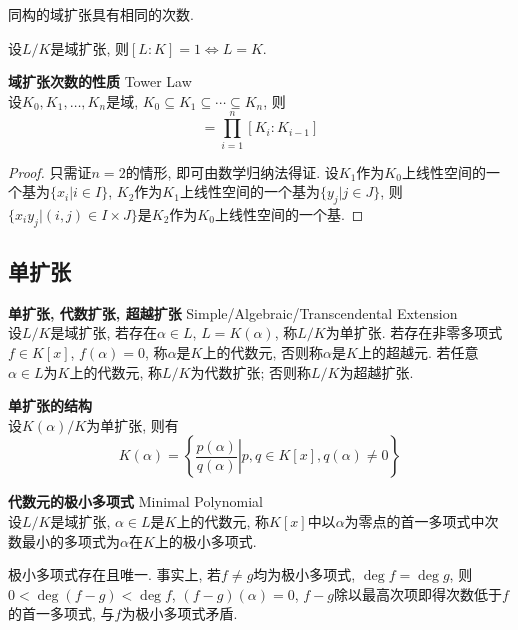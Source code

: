 同构的域扩张具有相同的次数. 

设$L/K$是域扩张, 则$[L:K]=1 \iff L=K$. 

\begin{dfn}\textbf{域扩张次数的性质} Tower Law\\
设$K_0,K_1,\dots,K_n$是域, $K_0 \subseteq K_1 \subseteq \cdots \subseteq K_n$, 则
\begin{equation}
    [K_n:K_0] = \prod_{i=1}^n [K_i:K_{i-1}]
\end{equation}
\end{dfn}
\begin{proof}
只需证$n=2$的情形, 即可由数学归纳法得证. 设$K_1$作为$K_0$上线性空间的一个基为$\{x_i \vert i\in I\}$, $K_2$作为$K_1$上线性空间的一个基为$\{y_j \vert j\in J\}$, 则$\{x_iy_j \vert (i,j)\in I\times J\}$是$K_2$作为$K_0$上线性空间的一个基. 
\end{proof}

\subsection{单扩张}

\begin{dfn} \textbf{单扩张, 代数扩张, 超越扩张} Simple/Algebraic/Transcendental Extension\\
设$L/K$是域扩张, 若存在$\alpha\in L$, $L=K(\alpha)$, 称$L/K$为单扩张. 若存在非零多项式$f\in K[x]$, $f(\alpha)=0$, 称$\alpha$是$K$上的代数元, 否则称$\alpha$是$K$上的超越元. 若任意$\alpha\in L$为$K$上的代数元, 称$L/K$为代数扩张;  否则称$L/K$为超越扩张. 
\end{dfn}


\begin{lem} \textbf{单扩张的结构}\\
设$K(\alpha)/K$为单扩张, 则有
\begin{equation}
    K(\alpha)=\left\{\left.\frac{p(\alpha)}{q(\alpha)}\right\vert p,q\in K[x], q(\alpha)\neq 0\right\}
\end{equation}
\end{lem}


\begin{dfn} \textbf{代数元的极小多项式} Minimal Polynomial\\
设$L/K$是域扩张, $\alpha\in L$是$K$上的代数元, 称$K[x]$中以$\alpha$为零点的首一多项式中次数最小的多项式为$\alpha$在$K$上的极小多项式. 
\end{dfn}
极小多项式存在且唯一. 事实上, 若$f\neq g$均为极小多项式, $\deg f = \deg g$, 则$0<\deg (f-g) < \deg f$, $(f-g)(\alpha)=0$, $f-g$除以最高次项即得次数低于$f$的首一多项式, 与$f$为极小多项式矛盾. 

